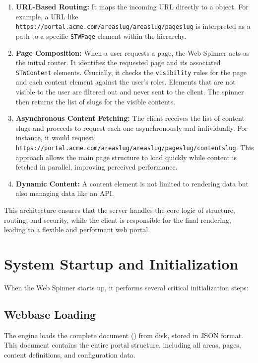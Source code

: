 \begin{enumerate}
	\item \textbf{URL-Based Routing:} It maps the incoming URL directly to a \webbase{} object. For example, a URL like \texttt{https://portal.acme.com/areaslug/areaslug/pageslug} is interpreted as a path to a specific \texttt{STWPage} element within the \webbase{} hierarchy.

	\item \textbf{Page Composition:} When a user requests a page, the Web Spinner acts as the initial router. It identifies the requested page and its associated \texttt{STWContent} elements. Crucially, it checks the \texttt{visibility} rules for the page and each content element against the user's roles. Elements that are not visible to the user are filtered out and never sent to the client. The spinner then returns the list of slugs for the visible contents.

	\item \textbf{Asynchronous Content Fetching:} The client receives the list of content slugs and proceeds to request each one asynchronously and individually. For instance, it would request \texttt{https://portal.acme.com/areaslug/areaslug/pageslug/contentslug}. This approach allows the main page structure to load quickly while content is fetched in parallel, improving perceived performance.

	\item \textbf{Dynamic Content:} A content element is not limited to rendering data but also managing data like an API.
\end{enumerate}

This architecture ensures that the server handles the core logic of structure, routing, and security, while the client is responsible for the final rendering, leading to a flexible and performant web portal.

\section{System Startup and Initialization}
\label{sec:system-startup}

When the Web Spinner starts up, it performs several critical initialization steps:

\subsection{Webbase Loading}

The engine loads the complete \wbdl{} document (\webbase{}) from disk, stored in JSON format. This document contains the entire portal structure, including all areas, pages, content definitions, and configuration data.

